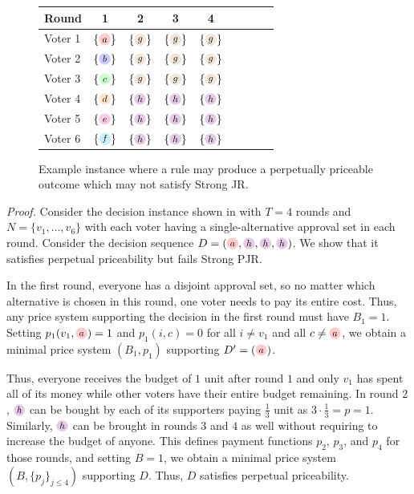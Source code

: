 \documentclass[10pt]{scrartcl}
\theoremstyle{plain}
\theoremstyle{definition}
\renewcommand*{\le}{\leqslant}
\newcommand{\alternativea}{\tikz[baseline=-3pt,transform shape,scale=0.85]{\node[text height=6pt,inner sep=1pt,fill=red!20,    circle,minimum width=12pt] (x) {$a$};}}
\newcommand{\alternativeb}{\tikz[baseline=-3pt,transform shape,scale=0.85]{\node[text height=6pt,inner sep=1pt,fill=blue!20,   circle,minimum width=12pt] (x) {$b$};}}
\newcommand{\alternativec}{\tikz[baseline=-3pt,transform shape,scale=0.85]{\node[text height=6pt,inner sep=1pt,fill=green!20,  circle,minimum width=12pt] (x) {$c$};}}
\newcommand{\alternatived}{\tikz[baseline=-3pt,transform shape,scale=0.85]{\node[text height=6pt,inner sep=1pt,fill=orange!20, circle,minimum width=12pt] (x) {$d$};}}
\newcommand{\alternativee}{\tikz[baseline=-3pt,transform shape,scale=0.85]{\node[text height=6pt,inner sep=1pt,fill=magenta!20,circle,minimum width=12pt] (x) {$e$};}}
\newcommand{\alternativef}{\tikz[baseline=-3pt,transform shape,scale=0.85]{\node[text height=6pt,inner sep=1pt,fill=cyan!20,   circle,minimum width=12pt,font=\small] (x) {$f$};}}
\newcommand{\alternativeg}{\tikz[baseline=-3pt,transform shape,scale=0.85]{\node[text height=6pt,inner sep=1pt,fill=brown!20,    circle,minimum width=12pt] (x) {$g$};}}
\newcommand{\alternativeh}{\tikz[baseline=-3pt,transform shape,scale=0.85]{\node[text height=6pt,inner sep=1pt,fill=violet!20,    circle,minimum width=12pt] (x) {$h$};}}
\begin{document}
\begin{figure}
	\vspace{-10pt}	
	\centering
{\setlength{\tabcolsep}{2.5pt}
		\begin{tabular}{lcccccccc}
			\toprule
			Round \hspace{6pt} & 1 & 2 & 3 & 4 \\
			\midrule
			Voter 1 & $\{\alternativea\}$ & $\{\alternativeg\}$ & $\{\alternativeg\}$ & $\{\alternativeg\}$ \\
			Voter 2 & $\{\alternativeb\}$ & $\{\alternativeg\}$ & $\{\alternativeg\}$ & $\{\alternativeg\}$ \\
			Voter 3 & $\{\alternativec\}$ & $\{\alternativeg\}$ & $\{\alternativeg\}$ & $\{\alternativeg\}$ \\
			Voter 4 & $\{\alternatived\}$ & $\{\alternativeh\}$ & $\{\alternativeh\}$ & $\{\alternativeh\}$ \\
			Voter 5 & $\{\alternativee\}$ & $\{\alternativeh\}$ & $\{\alternativeh\}$ & $\{\alternativeh\}$ \\
			Voter 6 & $\{\alternativef\}$ & $\{\alternativeh\}$ & $\{\alternativeh\}$ & $\{\alternativeh\}$ \\
			\bottomrule
	\end{tabular}}
	\caption{Example instance where a rule may produce a perpetually priceable outcome which may not satisfy Strong JR.}
    \label{fig:priceability_does_not_imply_some_rounds}
\end{figure}

\noindent
\emph{Proof.} Consider the decision instance shown in  with $T = 4$ rounds and $N = \{v_1, \ldots, v_6\}$ with each voter having a single-alternative approval set in each round. 
Consider the decision sequence $D = (\alternativea, \alternativeh, \alternativeh, \alternativeh)$. We show that it satisfies perpetual priceability but fails Strong PJR.

In the first round, everyone has a disjoint approval set, so no matter which alternative is chosen in this round, one voter needs to pay its entire cost. Thus, any price system supporting the decision in the first round must have $B_1 = 1$. Setting $p_1(v_1, \alternativea) = 1$ and $p_1(i, c) = 0$ for all $i \neq v_1$ and all $c \neq \alternativea$, we obtain a minimal price system $(B_1, p_1)$ supporting $D' = (\alternativea)$.





Thus, everyone receives the budget of $1$ unit after round $1$ and only $v_1$ has spent all of its money while other voters have their entire budget remaining. In round $2$, $\alternativeh$ can be bought by each of its supporters paying $\frac13$ unit as $3\cdot \frac13 = p = 1$. Similarly, $\alternativeh$ can be brought in rounds $3$ and $4$ as well without requiring to increase the budget of anyone. This defines payment functions $p_2$, $p_3$, and $p_4$ for those rounds, and setting $B = 1$, we obtain a minimal price system $(B, \{p_j\}_{j \le 4})$ supporting $D$. Thus, $D$ satisfies perpetual priceability. 
\end{document}
